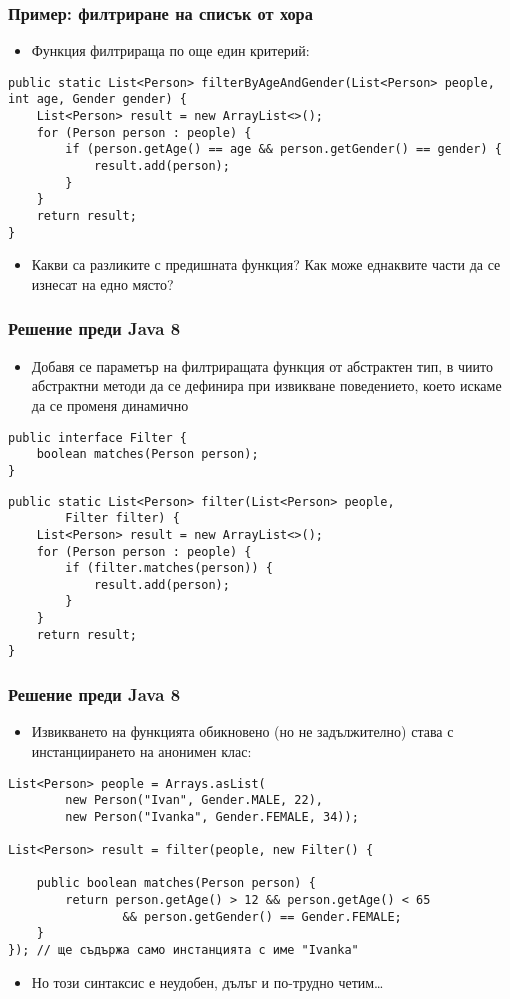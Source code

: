 \documentclass[ignorenonframetext, hyperref=unicode,compress,pdflatex]{beamer}
\begin{document}
\begin{frame}[containsverbatim]\frametitle{Пример: филтриране на списък от хора}
\begin{itemize}
  \item Функция филтрираща по още един критерий:
\end{itemize}
\begin{lstlisting}
public static List<Person> filterByAgeAndGender(List<Person> people, int age, Gender gender) {
	List<Person> result = new ArrayList<>();
	for (Person person : people) {
		if (person.getAge() == age && person.getGender() == gender) {
			result.add(person);
		}
	}
	return result;
}
\end{lstlisting}
\begin{itemize}
  \item Какви са разликите с предишната функция? Как може еднаквите части да се
  изнесат на едно място?
\end{itemize}
\end{frame}

\begin{frame}[containsverbatim]\frametitle{Решение преди Java 8}
\begin{itemize}
  \item Добавя се параметър на филтриращата функция от абстрактен тип, в чиито
  абстрактни методи да се дефинира при извикване поведението, което искаме да се
  променя динамично
\end{itemize}
\begin{lstlisting}
public interface Filter {
	boolean matches(Person person);
}
\end{lstlisting}
\begin{lstlisting}
public static List<Person> filter(List<Person> people,
		Filter filter) {
	List<Person> result = new ArrayList<>();
	for (Person person : people) {
		if (filter.matches(person)) {
			result.add(person);
		}
	}
	return result;
}
\end{lstlisting}
\end{frame}

\begin{frame}[containsverbatim]\frametitle{Решение преди Java 8}
\begin{itemize}
  \item Извикването на функцията обикновено (но не задължително) става с
  инстанциирането на анонимен клас:
\end{itemize}
\begin{lstlisting}
List<Person> people = Arrays.asList(
		new Person("Ivan", Gender.MALE, 22),
		new Person("Ivanka", Gender.FEMALE, 34));

List<Person> result = filter(people, new Filter() {

	public boolean matches(Person person) {
		return person.getAge() > 12 && person.getAge() < 65
				&& person.getGender() == Gender.FEMALE;
	}
}); // ще съдържа само инстанцията с име "Ivanka"
\end{lstlisting}
\begin{itemize}
  \item Но този синтаксис е неудобен, дълъг и по-трудно четим\ldots
\end{itemize}
\end{frame}
\end{document}
